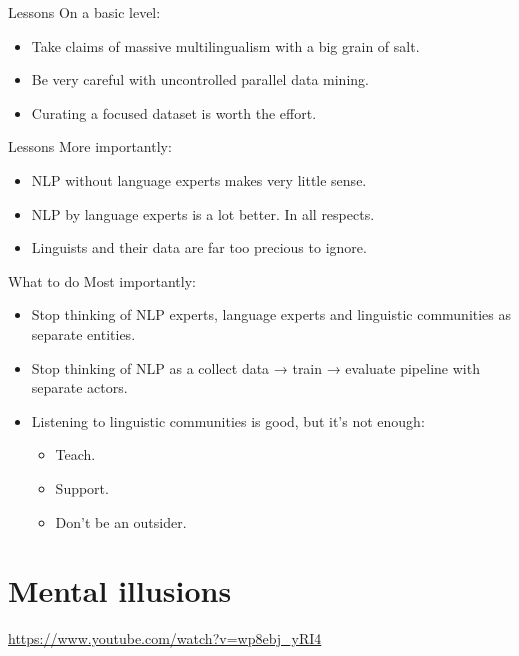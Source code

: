 \documentclass[
	xcolor={svgnames},
	aspectratio=169,
	french,
]{beamer}
\begin{document}
\begin{frame}{Lessons}
	On a basic level:
	\begin{itemize}[<+->]
		\item Take claims of massive multilingualism with a big grain of salt.
		\item Be very careful with uncontrolled parallel data mining.
		\item \alert{Curating} a \alert{focused} dataset is worth the effort.
	\end{itemize}
\end{frame}

\begin{frame}{Lessons}
	More importantly:
	\begin{itemize}[<+->]
		\item NLP without \alert{language experts} makes very little sense.
		\item NLP \alert{by} language experts is a lot better. In all respects.
		\item \alert{Linguists} and their data are far too precious to ignore.
	\end{itemize}
\end{frame}

\begin{frame}{What to do}
	Most importantly:
	\begin{itemize}[<+->]
		\item Stop thinking of NLP experts, language experts and linguistic communities as separate entities.
		\item Stop thinking of NLP as a collect data → train → evaluate pipeline with separate actors.
		\item \alert{Listening} to linguistic communities is good, but it's not enough:
			\begin{itemize}[<+->]
				\item Teach.
				\item Support.
				\item \alert{Don't be an outsider}.
			\end{itemize}
	\end{itemize}
\end{frame}

\section{Mental illusions}

\begin{frame}[plain]
	\begin{center}
		\Large\alert{\url{https://www.youtube.com/watch?v=wp8ebj_yRI4}}
	\end{center}
\end{frame}
\end{document}
